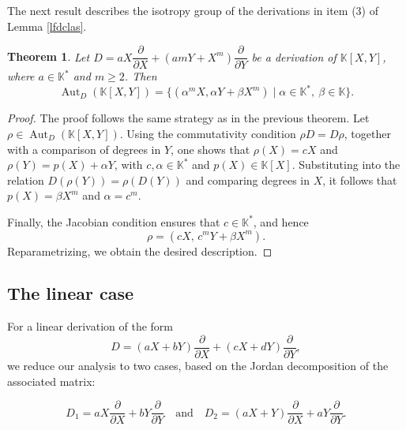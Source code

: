 \documentclass[11pt,a4paper,reqno]{amsart}
\newtheorem{theorem}{Theorem}[section]
\newcommand{\Aut}[0]{\ensuremath{\operatorname{Aut}}}
\begin{document}
The next result describes the isotropy group of the derivations in item (3) of Lemma \ref{lfdclas}.
    \begin{theorem}
\label{th3.4}
		Let $D=aX\dfrac{\partial}{\partial X}+(amY+X^m)\dfrac{\partial}{\partial Y}$ be a derivation of $\mathbb{K}[X,Y]$,	where   $a \in \mathbb{K}^{*}$ and $m\geq 2$. Then 
\[ 
\operatorname{Aut}_D(\mathbb{K}[X,Y])=
\{(\alpha^m X, \alpha Y+\beta X^m)  \mid \alpha \in \mathbb{K}^*,\ \beta \in \mathbb{K}\}.
\]
\end{theorem}
\begin{proof}
The proof follows the same strategy as in the previous theorem. Let $\rho \in \Aut_D(\mathbb{K}[X,Y])$.  Using the commutativity condition $\rho D = D\rho$, together with a comparison of degrees in $Y$, one shows that $\rho(X) = cX$ and $\rho(Y) = p(X) + \alpha Y$, with $c,\alpha \in \mathbb{K}^*$ and $p(X)\in \mathbb{K}[X]$. Substituting into the relation $D(\rho(Y)) = \rho(D(Y))$ and comparing degrees in $X$, it follows that $p(X) = \beta X^m$ and $\alpha = c^m$.

Finally, the Jacobian condition ensures that $c \in \mathbb{K}^*$, and hence
\[
\rho = (cX,\, c^m Y + \beta X^m).
\]
Reparametrizing, we obtain the desired description.
\end{proof}


\subsection{The linear case}

For a linear derivation of the form 
\[
D = (aX + bY)\frac{\partial}{\partial X} + (cX + dY)\frac{\partial}{\partial Y},
\]
we reduce our analysis to two cases, based on the Jordan decomposition of the associated matrix:

\[
D_1 = aX \frac{\partial}{\partial X} + bY \frac{\partial}{\partial Y} \quad \text{and} \quad D_2 = (aX + Y)\frac{\partial}{\partial X} + aY \frac{\partial}{\partial Y}.
\]
\end{document}
